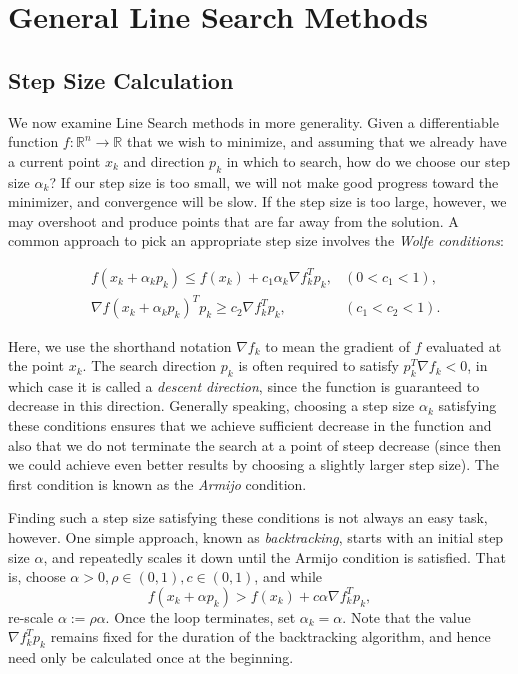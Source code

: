 \section*{General Line Search Methods}
\subsection*{Step Size Calculation}
We now examine Line Search methods in more generality. Given a differentiable function
$f : \mathbb{R}^n \rightarrow \mathbb{R}$ that we wish to minimize, and assuming that
we already have a current point $x_k$ and direction $p_k$ in which to search, how do we
choose our step size $\alpha_k$? If our step size is too small, we will not make good progress
toward the minimizer, and convergence will be slow. If the step size is too large, however,
we may overshoot and produce points that are far away from the solution.
A common approach to pick an appropriate step size involves the \emph{Wolfe conditions}:

\begin{align*}
&f(x_k + \alpha_kp_k) \leq f(x_k) + c_1\alpha_k\nabla f_k^Tp_k, &(0 < c_1 < 1),
\\ &\nabla f(x_k + \alpha_kp_k)^Tp_k \geq c_2\nabla f_k^Tp_k, &(c_1 < c_2 < 1).
\end{align*}

Here, we use the shorthand notation $\nabla f_k$ to
mean the gradient of $f$ evaluated at the point $x_k$. The search direction $p_k$ is
often required to satisfy $p_k^T \nabla f_k < 0$, in which case it is called a
\emph{descent direction}, since the function is guaranteed to decrease in
this direction. Generally speaking, choosing a step size $\alpha_k$ satisfying these conditions
ensures that we achieve sufficient decrease in the function and also that we do not
terminate the search at a point of steep decrease (since then we could achieve even
better results by choosing a slightly larger step size). The first condition is known
as the \emph{Armijo} condition.

Finding such a step size satisfying these conditions is not always an easy task, however.
One simple approach, known as \emph{backtracking}, starts with an initial step size
$\alpha$, and repeatedly scales it down until the Armijo condition is satisfied.
That is, choose $\alpha >0, \rho \in (0, 1), c\in (0, 1)$, and while
$$
f(x_k + \alpha p_k) > f(x_k) + c\alpha\nabla f_k^Tp_k,
$$
re-scale $\alpha := \rho\alpha$. Once the loop terminates, set $\alpha_k = \alpha$. Note that the value
$\nabla f_k^Tp_k$ remains fixed for the duration of the backtracking algorithm, and hence need only
be calculated once at the beginning.


